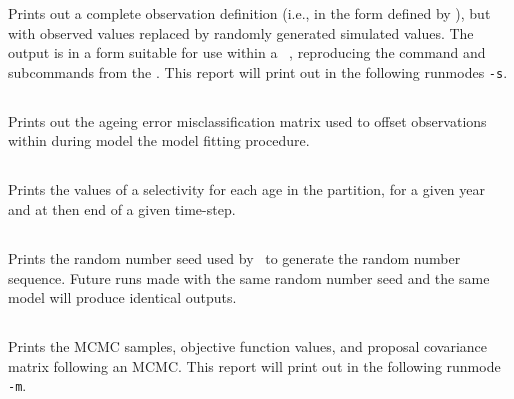 Prints out a complete observation definition (i.e., in the form defined by ), but with observed values replaced by randomly generated simulated values. The output is in a form  suitable for use within a \CNAME\ \config, reproducing the command and subcommands from the \config. This report will print out in the following runmodes \texttt{-s}.

\subsection{}\label{sec:ageingerrorreport}

Prints out the ageing error misclassification matrix used to offset observations within during model the model fitting procedure.

\subsection{}

Prints the values of a selectivity for each age in the partition, for a given year and at then end of a given time-step.

\subsection{}

Prints the random number seed used by \CNAME\ to generate the random number sequence. Future runs made with the same random number seed and the same model will produce identical outputs.

\subsection{}

Prints the MCMC samples, objective function values, and proposal covariance matrix following an MCMC. This report will print out in the following runmode \texttt{-m}.

\subsection{}

